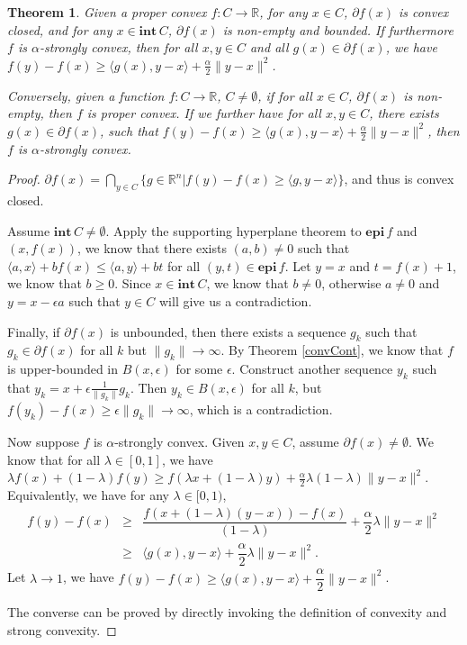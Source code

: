 \documentclass[openany]{book}
\newtheorem{theorem}{Theorem}[chapter]
\theoremstyle{definition}
\theoremstyle{remark}
\begin{document}
\begin{theorem}\label{thm:convSubgrad}
    Given a proper convex $f:C\rightarrow \mathbb{R}$, for any $x\in C$, $\partial f(x)$ is convex closed, and for any $x\in \mathbf{int}\,C$, $\partial f(x)$ is non-empty and bounded. If furthermore $f$ is $\alpha$-strongly convex, then for all $x,y\in C$ and all $g(x)\in\partial f(x)$, we have $f(y)-f(x)\ge \langle g(x),y-x\rangle+\frac{\alpha}{2}\|y-x\|^2$.

    Conversely, given a function $f:C\to \mathbb{R}$, $C\ne\emptyset$, if for all $x\in C$, $\partial f(x)$ is non-empty, then $f$ is proper convex.  If we further have for all $x,y\in C$, there exists $g(x)\in\partial f(x)$, such that $f(y)-f(x)\ge \langle g(x),y-x\rangle+\frac{\alpha}{2}\|y-x\|^2$, then $f$ is $\alpha$-strongly convex.
\end{theorem}
\begin{proof}
    $\partial f(x)=\bigcap_{y\in C}\{g\in \mathbb{R}^n|f(y)-f(x)\ge \langle g,y-x\rangle\}$, and thus is convex closed.

    Assume $\mathbf{int}\,C\ne\emptyset$. Apply the supporting hyperplane theorem to $\mathbf{epi}\,f$ and $(x,f(x))$, we know that there exists $(a,b)\ne0$ such that $\langle a,x\rangle+bf(x)\le \langle a,y\rangle+bt$ for all $(y,t)\in \mathbf{epi}\,f$. Let $y=x$ and $t=f(x)+1$, we know that $b\ge0$. Since $x\in \mathbf{int}\,C$, we know that $b\ne0$, otherwise $a\ne0$ and $y=x-\epsilon a$ such that $y\in C$ will give us a contradiction.

    Finally, if $\partial f(x)$ is unbounded, then there exists a sequence $g_k$ such that $g_k\in\partial f(x)$ for all $k$ but $\|g_k\|\to\infty$. By Theorem \ref{convCont}, we know that $f$ is upper-bounded in $B(x,\epsilon)$ for some $\epsilon$. Construct another sequence $y_k$ such that $y_k=x+\epsilon \frac{1}{\|g_k\|}g_k$. Then $y_k\in B(x,\epsilon)$ for all $k$, but $f(y_k)-f(x)\ge\epsilon\|g_k\|\to\infty$, which is a contradiction.

    Now suppose $f$ is $\alpha$-strongly convex. Given $x,y\in C$, assume $\partial f(x)\ne\emptyset$. We know that for all $\lambda\in[0,1]$, we have $\lambda f(x)+(1-\lambda)f(y)\ge f(\lambda x+(1-\lambda)y)+\frac{\alpha}{2}\lambda(1-\lambda)\|y-x\|^2$. Equivalently, we have for any $\lambda\in[0,1)$,
    \begin{equation*}
        \begin{array}{rcl}
            f(y)-f(x) & \ge & \dfrac{f(x+(1-\lambda)(y-x))-f(x)}{(1-\lambda)}+\dfrac{\alpha}{2}\lambda\|y-x\|^2 \\
             & \ge & \langle g(x),y-x\rangle+\dfrac{\alpha}{2}\lambda\|y-x\|^2.
        \end{array}
    \end{equation*}
    Let $\lambda\to1$, we have $f(y)-f(x)\ge \langle g(x),y-x\rangle+\dfrac{\alpha}{2}\|y-x\|^2$.

    The converse can be proved by directly invoking the definition of convexity and strong convexity.
\end{proof}
\end{document}
